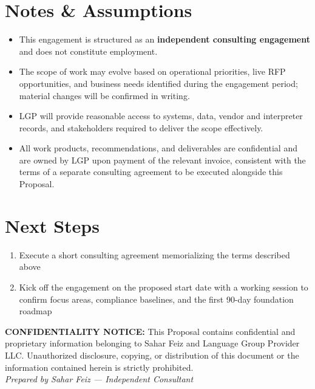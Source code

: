 \documentclass{proposal}
\begin{document}
\section{Notes \& Assumptions}

\begin{itemize}[leftmargin=1.5em, itemsep=4pt, topsep=4pt]
  \item This engagement is structured as an \textbf{independent consulting
        engagement} and does not constitute employment.
  \item The scope of work may evolve based on operational priorities, live
        RFP opportunities, and business needs identified during the
        engagement period; material changes will be confirmed in writing.
  \item LGP will provide reasonable access to systems, data, vendor and
        interpreter records, and stakeholders required to deliver the
        scope effectively.
  \item All work products, recommendations, and deliverables are
        confidential and are owned by LGP upon payment of the relevant
        invoice, consistent with the terms of a separate consulting
        agreement to be executed alongside this Proposal.
\end{itemize}

\section{Next Steps}

\begin{enumerate}[leftmargin=1.5em, itemsep=4pt, topsep=4pt]
  \item Execute a short consulting agreement memorializing the terms
        described above
  \item Kick off the engagement on the proposed start date with a working
        session to confirm focus areas, compliance baselines, and the
        first 90-day foundation roadmap
\end{enumerate}

\vspace{28pt}

\begin{mdframed}[
  linecolor=TPBorder,
  linewidth=1pt,
  roundcorner=4pt,
  backgroundcolor=TPLight,
  innerleftmargin=14pt,
  innerrightmargin=14pt,
  innertopmargin=10pt,
  innerbottommargin=10pt
]
\sffamily\footnotesize\color{TPGray}
\textbf{CONFIDENTIALITY NOTICE:} This Proposal contains confidential and
proprietary information belonging to Sahar Feiz and Language Group Provider
LLC. Unauthorized disclosure, copying, or distribution of this document or
the information contained herein is strictly prohibited.\\[4pt]
\textit{Prepared by Sahar Feiz --- Independent Consultant}
\end{mdframed}
\end{document}
